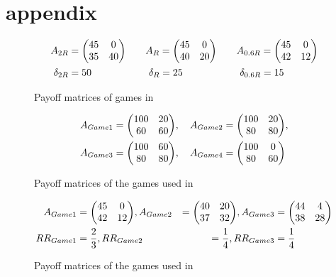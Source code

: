 \documentclass[11pt]{article}
\begin{document}
\section{appendix}
\begin{figure}[h]
\caption{Payoff matrices of games in \textcite{battalio_optimization_2001}}
        \label{figpayoffbattalio}
\begin{alignat*}{3}
        A_{2R} &= \mqty(45 & 0 \\ 35 & 40) \quad & &A_{R} = \mqty(45 & 0 \\ 
        40 & 20) \quad & &A_{0.6R} = \mqty( 45 & 0 \\ 42 & 12) \\
        \delta_{2R} &= 50  \quad & &\ \delta_{R} = 25 \quad & &\ \delta_{0.6R} = 15
\end{alignat*}
\end{figure}
\begin{figure}[H]
\label{fig:payoffschmidt}
\caption{Payoff matrices of the games used in \cite{schmidt_playing_2003}}
\begin{alignat*}{3}
        A_{Game1} = \mqty( 100 & 20 \\ 60 & 60), \quad A_{Game2} 
                               &= \mqty( 100 & 20 \\ 80 & 80), \\ 
        A_{Game3} = \mqty( 100 
             & 60 \\ 80 & 80), \quad A_{Game4} &= \mqty( 100
                             & 0 \\ 80 & 60)
        \end{alignat*}
\end{figure}
\begin{figure}[H]
        \caption{Payoff matrices of the games used
        in \cite{dubois_optimization_2012}}
        \label{fig:payoffdubois}
        \begin{alignat*}{3}     
                A_{Game1} &= \mqty(45 & 0 \\ 42 & 12),
                A_{Game2} &= \mqty(40 & 20 \\37 & 32),
                A_{Game3} &= \mqty(44 & 4 \\ 38 & 28) \\
                RR_{Game1}&= \frac 23, RR_{Game2}&=\frac 14, RR_{Game3}&=
                \frac 14
        \end{alignat*}
\end{figure}
\printbibliography
\end{document}
